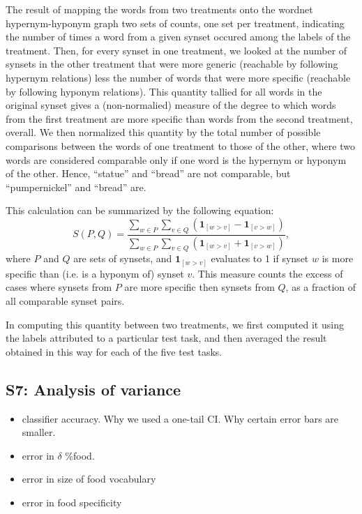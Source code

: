 \documentclass[12pt]{article}
\begin{document}
The result of mapping the words from two treatments onto the wordnet 
hypernym-hyponym graph two sets of counts, one set per treatment, 
indicating the number of times a word from a given synset occured among the
labels of the treatment.  Then, for every synset in one treatment, we looked
at the number of synsets in the other treatment that were more generic
(reachable by following hypernym relations) less the number of words that
were more specific (reachable by following hyponym relations).  This quantity
tallied for all words in the original synset gives a (non-normalied) measure
of the degree to which words from the first treatment are more specific
than words from the second treatment, overall.  We then normalized this 
quantity by the total number of possible comparisons between the words of
one treatment to those of the other, where two words are considered comparable
only if one word is the hypernym or hyponym of the other.  Hence, ``statue'' 
and ``bread'' are not comparable, but ``pumpernickel'' and ``bread'' are.

This calculation can be summarized by the following equation:
\begin{equation}
	S(P,Q) = \frac{
		\sum_{w\in P}\sum_{v\in Q} \left(
			\mathbf{1}_{[w>v]} - \mathbf{1}_{[v>w]} \right)
	}{
		\sum_{w\in P}\sum_{v\in Q} \left(
			\mathbf{1}_{[w>v]} + \mathbf{1}_{[v>w]} \right)
	},
\end{equation}
where $P$ and $Q$ are sets of synsets, and $\mathbf{1}_{[w>v]}$ evaluates
to 1 if synset $w$ is more specific than (i.e. is a hyponym of) synset $v$.
This measure counts the excess of cases where synsets from $P$ are more
specific then synsets from $Q$, as a fraction of all comparable synset pairs. 

In computing this quantity between two treatments, we first computed it 
using the labels attributed to a particular test task, and then
averaged the result obtained in this way for each of the five test tasks.

\subsection*{S7: Analysis of variance}
\begin{itemize}
	\item{
		classifier accuracy.  Why we used a one-tail CI.  
		Why certain error bars are smaller.
	}
	\item{error in $\delta$ \%food.}
	\item{error in size of food vocabulary}
	\item{error in food specificity}
\end{itemize}
\end{document}
